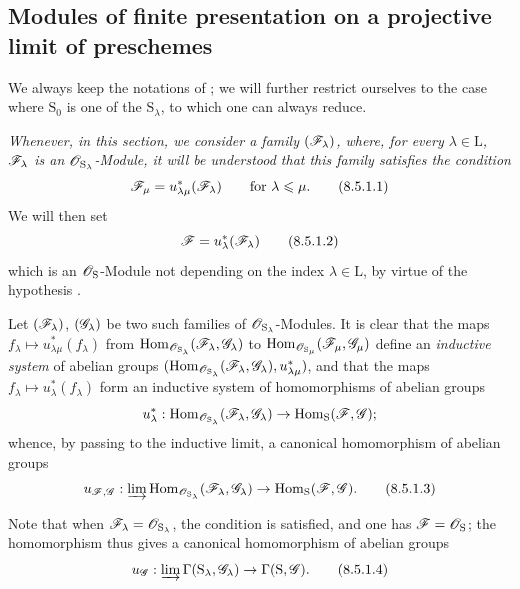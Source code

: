 \subsection{Modules of finite presentation on a projective limit of preschemes}
\label{subsection:IV.8.5}

\begin{env}[8.5.1]
\label{IV.8.5.1}
We always keep the notations of ; we will further restrict ourselves to the case where $\mathrm{S}_0$ is one of the $\mathrm{S}_\lambda$, to which one can always reduce.

\emph{Whenever, in this section, we consider a family $(\mathscr{F}_\lambda)$, where, for every $\lambda\in\mathrm{L}$, $\mathscr{F}_\lambda$ is an $\mathscr{O}_{\mathrm{S}_\lambda}$-Module, it will be understood that this family satisfies the condition}
\begin{equation}
  \mathscr{F}_\mu=u_{\lambda\mu}^*(\mathscr{F}_\lambda) \qquad\text{for }\lambda\leqslant\mu.
  \tag{8.5.1.1}
\label{IV.8.5.1.1}
\end{equation}
We will then set
\begin{equation}
  \mathscr{F}=u_\lambda^*(\mathscr{F}_\lambda)
  \label{IV.8.5.1.2}
\tag{8.5.1.2}
\end{equation}
which is an $\mathscr{O}_\mathrm{S}$-Module not depending on the index $\lambda\in\mathrm{L}$, by virtue of the hypothesis .

Let $(\mathscr{F}_\lambda)$, $(\mathscr{G}_\lambda)$ be two such families of $\mathscr{O}_{\mathrm{S}_\lambda}$-Modules.
It is clear that the maps $f_\lambda\mapsto u_{\lambda\mu}^*(f_\lambda)$ from $\operatorname{Hom}_{\mathscr{O}_{\mathrm{S}_\lambda}}(\mathscr{F}_\lambda,\mathscr{G}_\lambda)$ to $\operatorname{Hom}_{\mathscr{O}_{\mathrm{S}_\mu}}(\mathscr{F}_\mu,\mathscr{G}_\mu)$ define an \emph{inductive system} of abelian groups $(\operatorname{Hom}_{\mathscr{O}_{\mathrm{S}_\lambda}}(\mathscr{F}_\lambda,\mathscr{G}_\lambda),u_{\lambda\mu}^*)$, and that the maps $f_\lambda\mapsto u_\lambda^*(f_\lambda)$ form an inductive system of homomorphisms of abelian groups
\[
  u_\lambda^*:\operatorname{Hom}_{\mathscr{O}_{\mathrm{S}_\lambda}}(\mathscr{F}_\lambda,\mathscr{G}_\lambda)\to\operatorname{Hom}_\mathrm{S}(\mathscr{F},\mathscr{G});
\]
whence, by passing to the inductive limit, a canonical homomorphism of abelian groups
\begin{equation}
  u_{\mathscr{F},\mathscr{G}}:\varinjlim\operatorname{Hom}_{\mathscr{O}_{\mathrm{S}_\lambda}}(\mathscr{F}_\lambda,\mathscr{G}_\lambda)\to\operatorname{Hom}_\mathrm{S}(\mathscr{F},\mathscr{G}).
  \tag{8.5.1.3}
\label{IV.8.5.1.3}
\end{equation}

Note that when $\mathscr{F}_\lambda=\mathscr{O}_{\mathrm{S}_\lambda}$, the condition  is satisfied, and one has $\mathscr{F}=\mathscr{O}_\mathrm{S}$; the homomorphism  thus gives  a canonical homomorphism of abelian groups
\begin{equation}
  u_{\mathscr{G}}:\varinjlim\Gamma(\mathrm{S}_\lambda,\mathscr{G}_\lambda)\to\Gamma(\mathrm{S},\mathscr{G}).
  \tag{8.5.1.4}
\label{IV.8.5.1.4}
\end{equation}
\end{env}

